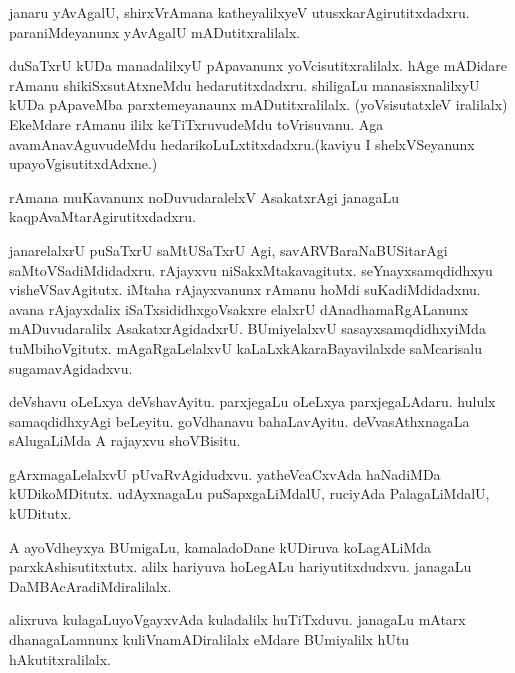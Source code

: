 \documentclass{article}
\begin{document}
\begin{mn}%
janaru yAvAgalU, shirxVrAmana katheyalilxyeV utusxkarAgirutitxdadxru. paraniMdeyanunx 
yAvAgalU mADutitxralilalx.
\end{mn}

\begin{mn}%
duSaTxrU kUDa manadalilxyU pApavanunx yoVcisutitxralilalx. hAge mADidare rAmanu 
shikiSxsutAtxneMdu hedarutitxdadxru. shiligaLu manasisxnalilxyU kUDa pApaveMba 
parxtemeyanaunx mADutitxralilalx. (yoVsisutatxleV iralilalx) EkeMdare rAmanu ililx 
keTiTxruvudeMdu toVrisuvanu. Aga avamAnavAguvudeMdu hedarikoLuLxtitxdadxru.(kaviyu I 
shelxVSeyanunx upayoVgisutitxdAdxne.)
\end{mn}

\begin{mn}%
rAmana muKavanunx noDuvudaralelxV AsakatxrAgi janagaLu kaqpAvaMtarAgirutitxdadxru.
\end{mn}

\begin{mn}%
janarelalxrU puSaTxrU saMtUSaTxrU Agi, savARVBaraNaBUSitarAgi saMtoVSadiMdidadxru. 
rAjayxvu niSakxMtakavagitutx. seYnayxsamqdidhxyu visheVSavAgitutx. iMtaha rAjayxvanunx 
rAmanu hoMdi suKadiMdidadxnu. avana rAjayxdalix iSaTxsididhxgoVsakxre elalxrU 
dAnadhamaRgALanunx mADuvudaralilx AsakatxrAgidadxrU. BUmiyelalxvU sasayxsamqdidhxyiMda 
tuMbihoVgitutx. mAgaRgaLelalxvU kaLaLxkAkaraBayavilalxde saMcarisalu sugamavAgidadxvu.
\end{mn}

\begin{mn}%
deVshavu oLeLxya deVshavAyitu. parxjegaLu oLeLxya parxjegaLAdaru. hululx samaqdidhxyAgi 
beLeyitu. goVdhanavu bahaLavAyitu. deVvasAthxnagaLa sAlugaLiMda A rajayxvu shoVBisitu.
\end{mn}

\begin{mn}%
gArxmagaLelalxvU pUvaRvAgidudxvu. yatheVcaCxvAda haNadiMDa kUDikoMDitutx. udAyxnagaLu 
puSapxgaLiMdalU, ruciyAda PalagaLiMdalU, kUDitutx.
\end{mn}

\begin{mn}%
A ayoVdheyxya BUmigaLu, kamaladoDane kUDiruva koLagALiMda parxkAshisutitxtutx. alilx 
hariyuva hoLegALu hariyutitxdudxvu. janagaLu DaMBAcAradiMdiralilalx.
\end{mn}

\begin{mn}%
alixruva kulagaLuyoVgayxvAda kuladalilx huTiTxduvu. janagaLu mAtarx dhanagaLamnunx 
kuliVnamADiralilalx eMdare BUmiyalilx hUtu hAkutitxralilalx.
\end{mn}
\end{document}

